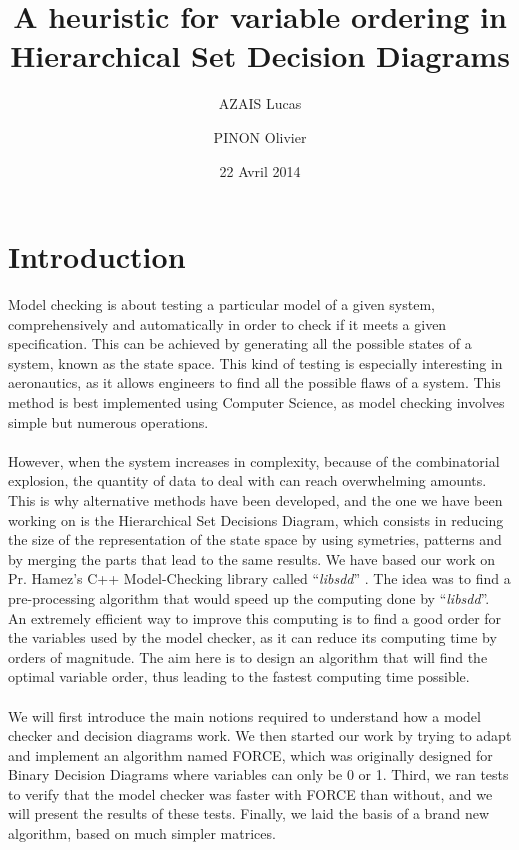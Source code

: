 \documentclass[12pt]{report}
\title{A heuristic for variable ordering in Hierarchical Set Decision Diagrams}
\author{ AZAIS Lucas \and PINON Olivier}
\date{22 Avril 2014}
\begin{document}
\maketitle

\tableofcontents
\newpage

\section*{Introduction} %

Model checking is about testing a particular model of a given system, comprehensively and automatically in order to check if it meets a given specification. This can be achieved by generating all the possible states of a system, known as the state space. This kind of testing is especially interesting in aeronautics, as it allows engineers to find all the possible flaws of a system. This method is best implemented using Computer Science, as model checking involves simple but numerous operations.
\\\\
However, when the system increases in complexity, because of the combinatorial explosion, the quantity of data to deal with can reach overwhelming amounts. This is why alternative methods have been developed, and the one we have been working on is the Hierarchical Set Decisions Diagram, which consists in reducing the size of the representation of the state space by using symetries, patterns and by merging the parts that lead to the same results. We have based our work on Pr. Hamez’s C++ Model-Checking library called \enquote{\textit{libsdd}} \cite{libsdd}. The idea was to find a pre-processing algorithm that would speed up the computing done by \enquote{\textit{libsdd}}. An extremely efficient way to improve this computing is to find a good order for the variables used by the model checker, as it can reduce its computing time by orders of magnitude. The aim here is to design an algorithm that will find the optimal variable order, thus leading to the fastest computing time possible.
\\\\
We will first introduce the main notions required to understand how a model checker and decision diagrams work. We then started our work by trying to adapt and implement an algorithm named FORCE, which was originally designed for Binary Decision Diagrams where variables can only be 0 or 1. Third, we ran tests to verify that the model checker was faster with FORCE than without, and we will present the results of these tests. Finally, we laid the basis of a brand new algorithm, based on much simpler matrices.
\end{document}
